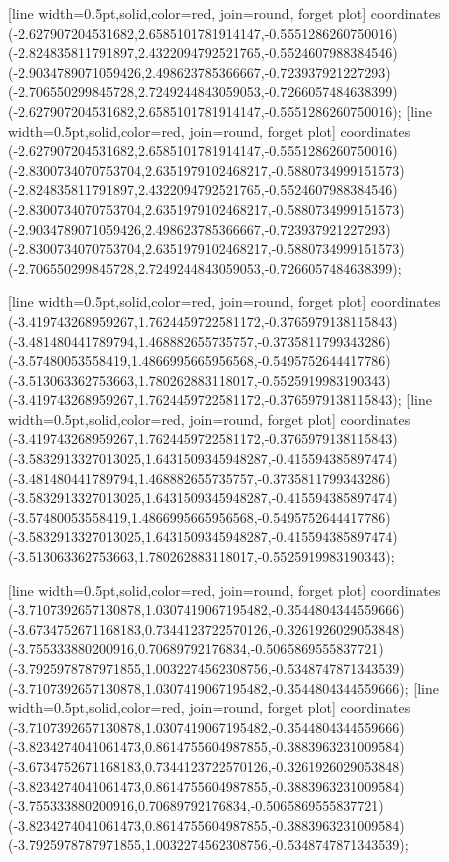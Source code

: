[line width=0.5pt,solid,color=red, join=round, forget plot] coordinates {(-2.627907204531682,2.6585101781914147,-0.5551286260750016) (-2.824835811791897,2.4322094792521765,-0.5524607988384546) (-2.9034789071059426,2.498623785366667,-0.723937921227293) (-2.706550299845728,2.7249244843059053,-0.7266057484638399) (-2.627907204531682,2.6585101781914147,-0.5551286260750016)};
[line width=0.5pt,solid,color=red, join=round, forget plot] coordinates {(-2.627907204531682,2.6585101781914147,-0.5551286260750016) (-2.8300734070753704,2.6351979102468217,-0.5880734999151573) (-2.824835811791897,2.4322094792521765,-0.5524607988384546) (-2.8300734070753704,2.6351979102468217,-0.5880734999151573) (-2.9034789071059426,2.498623785366667,-0.723937921227293) (-2.8300734070753704,2.6351979102468217,-0.5880734999151573) (-2.706550299845728,2.7249244843059053,-0.7266057484638399)};

[line width=0.5pt,solid,color=red, join=round, forget plot] coordinates {(-3.419743268959267,1.7624459722581172,-0.3765979138115843) (-3.481480441789794,1.468882655735757,-0.3735811799343286) (-3.57480053558419,1.4866995665956568,-0.5495752644417786) (-3.513063362753663,1.780262883118017,-0.5525919983190343) (-3.419743268959267,1.7624459722581172,-0.3765979138115843)};
[line width=0.5pt,solid,color=red, join=round, forget plot] coordinates {(-3.419743268959267,1.7624459722581172,-0.3765979138115843) (-3.5832913327013025,1.6431509345948287,-0.415594385897474) (-3.481480441789794,1.468882655735757,-0.3735811799343286) (-3.5832913327013025,1.6431509345948287,-0.415594385897474) (-3.57480053558419,1.4866995665956568,-0.5495752644417786) (-3.5832913327013025,1.6431509345948287,-0.415594385897474) (-3.513063362753663,1.780262883118017,-0.5525919983190343)};

[line width=0.5pt,solid,color=red, join=round, forget plot] coordinates {(-3.7107392657130878,1.0307419067195482,-0.3544804344559666) (-3.6734752671168183,0.7344123722570126,-0.3261926029053848) (-3.755333880200916,0.70689792176834,-0.5065869555837721) (-3.7925978787971855,1.0032274562308756,-0.5348747871343539) (-3.7107392657130878,1.0307419067195482,-0.3544804344559666)};
[line width=0.5pt,solid,color=red, join=round, forget plot] coordinates {(-3.7107392657130878,1.0307419067195482,-0.3544804344559666) (-3.8234274041061473,0.8614755604987855,-0.3883963231009584) (-3.6734752671168183,0.7344123722570126,-0.3261926029053848) (-3.8234274041061473,0.8614755604987855,-0.3883963231009584) (-3.755333880200916,0.70689792176834,-0.5065869555837721) (-3.8234274041061473,0.8614755604987855,-0.3883963231009584) (-3.7925978787971855,1.0032274562308756,-0.5348747871343539)};


